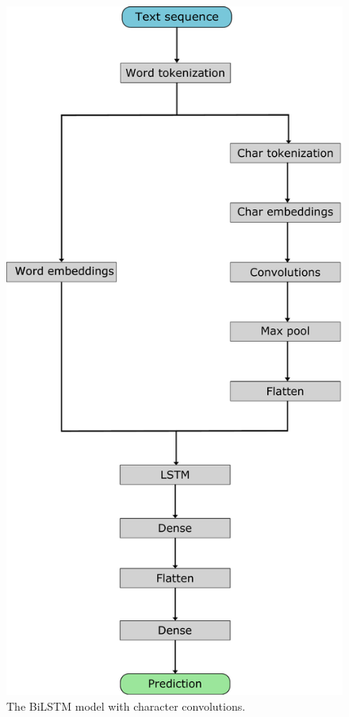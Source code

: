 \documentclass[nofilelist]{cslthse-msc}
\begin{document}
\begin{figure}[ht]
    \centering
    \includegraphics[width=\textwidth*2/3]{BiLSTM.pdf}
    \caption{The BiLSTM model with character convolutions.}
    \label{fig:bilstmmodel}
\end{figure}
\end{document}
